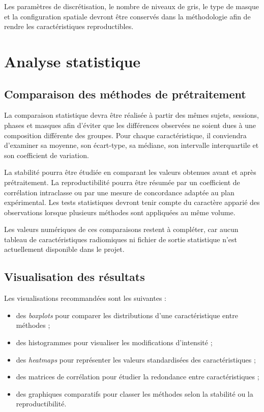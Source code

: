 Les paramètres de discrétisation, le nombre de niveaux de gris, le type de masque et la configuration spatiale devront être conservés dans la méthodologie afin de rendre les caractéristiques reproductibles.

\section{Analyse statistique}
\label{sec:analyse_statistique}

\subsection{Comparaison des méthodes de prétraitement}
\label{subsec:comparaison_pretraitement}

La comparaison statistique devra être réalisée à partir des mêmes sujets, sessions, phases et masques afin d'éviter que les différences observées ne soient dues à une composition différente des groupes. Pour chaque caractéristique, il conviendra d'examiner sa moyenne, son écart-type, sa médiane, son intervalle interquartile et son coefficient de variation.

La stabilité pourra être étudiée en comparant les valeurs obtenues avant et après prétraitement. La reproductibilité pourra être résumée par un coefficient de corrélation intraclasse ou par une mesure de concordance adaptée au plan expérimental. Les tests statistiques devront tenir compte du caractère apparié des observations lorsque plusieurs méthodes sont appliquées au même volume.

Les valeurs numériques de ces comparaisons restent à compléter, car aucun tableau de caractéristiques radiomiques ni fichier de sortie statistique n'est actuellement disponible dans le projet.

\subsection{Visualisation des résultats}
\label{subsec:visualisation_resultats}

Les visualisations recommandées sont les suivantes :

\begin{itemize}
    \item des \textit{boxplots} pour comparer les distributions d'une caractéristique entre méthodes ;
    \item des histogrammes pour visualiser les modifications d'intensité ;
    \item des \textit{heatmaps} pour représenter les valeurs standardisées des caractéristiques ;
    \item des matrices de corrélation pour étudier la redondance entre caractéristiques ;
    \item des graphiques comparatifs pour classer les méthodes selon la stabilité ou la reproductibilité.
\end{itemize}

